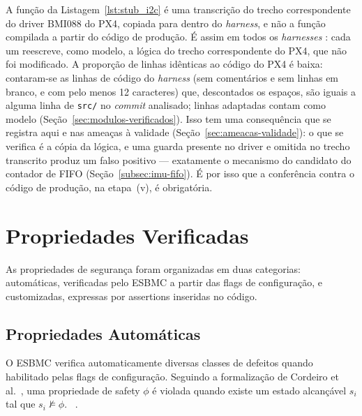 A função da Listagem~\ref{lst:stub_i2c} é uma transcrição do trecho
correspondente do driver BMI088 do PX4, copiada para dentro do
\textit{harness}, e não a função compilada a partir do código de produção. É assim
em todos os \textit{harnesses} : cada um reescreve, como modelo, a lógica do trecho
correspondente do PX4, que não foi modificado. A proporção de linhas idênticas ao código do PX4 é
baixa: contaram-se as linhas de código do \textit{harness} (sem comentários e sem linhas em branco, e com pelo menos 12 caracteres) que, descontados os espaços, são iguais a alguma linha de \texttt{src/} no \textit{commit} analisado; linhas adaptadas contam como modelo (Seção~\ref{sec:modulos-verificados}). Isso tem uma consequência que se registra aqui e nas
ameaças à validade (Seção~\ref{sec:ameacas-validade}): o que se verifica é a
cópia da lógica, e uma guarda presente no driver e omitida no trecho transcrito
produz um falso positivo --- exatamente o mecanismo do candidato do contador de
FIFO (Seção~\ref{subsec:imu-fifo}). É por isso que a conferência contra o código
de produção, na etapa~(v), é obrigatória. 

\section{Propriedades Verificadas}
\label{sec:propriedades}

As propriedades de segurança foram organizadas em duas categorias: automáticas,
verificadas pelo ESBMC a partir das flags de configuração, e customizadas,
expressas por assertions inseridas no código.

\subsection{Propriedades Automáticas}

O ESBMC verifica automaticamente diversas classes de defeitos quando habilitado
pelas flags de configuração. Seguindo a formalização de Cordeiro et al.~\cite{Cordeiro2012}, uma propriedade de safety $\phi$ é violada quando existe um estado alcançável $s_i$ tal que $s_i \not\models \phi$. ~\cite{Cordeiro2012,ESBMC_GitHub}.

